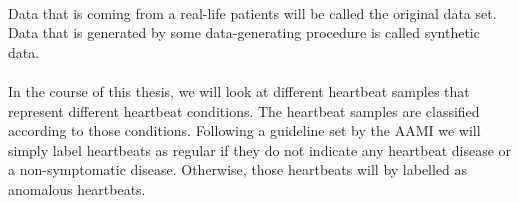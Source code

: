 \paragraph{}
Data that is coming from a real-life patients will be called the original data set. Data that is generated by some data-generating procedure is called synthetic data.

\paragraph{}
In the course of this thesis, we will look at different heartbeat samples that represent different heartbeat conditions. The heartbeat samples are classified according to those conditions. Following a guideline set by the AAMI we will simply label heartbeats as regular if they do not indicate any heartbeat disease or a non-symptomatic disease. Otherwise, those heartbeats will by labelled as anomalous heartbeats.